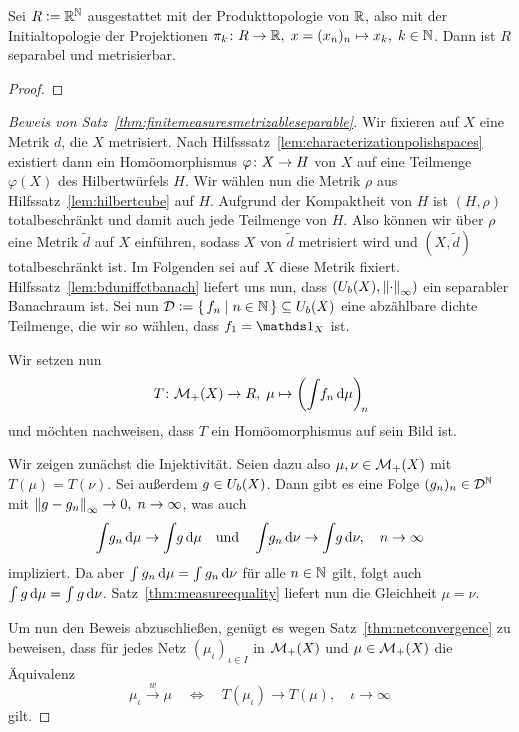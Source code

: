 \documentclass[../main/main.tex]{subfiles}
\begin{document}
	\begin{Hilfssatz}
		Sei $R \vcentcolon = \mathbb{R}^{\mathbb{N}}$ ausgestattet mit der Produkttopologie von $\mathbb{R}$, also mit der Initialtopologie der Projektionen $\pi_k \colon R \to \mathbb{R}, \; x = (x_n)_n \mapsto x_k , \; k \in \mathbb{N}$. Dann ist $R$ 
		separabel und metrisierbar.
	\end{Hilfssatz}
	
	\begin{proof}
	\end{proof}
	
	\begin{proof}[Beweis von Satz~\ref{thm:finitemeasuresmetrizableseparable}]
		Wir fixieren auf $X$ eine Metrik $d$, die $X$ metrisiert. Nach Hilfsssatz~\ref{lem:characterizationpolishspaces} existiert dann ein Homöomorphismus $\varphi \colon X \to H$ von
		$X$ auf eine Teilmenge $\varphi(X)$ des Hilbertwürfels $H$. Wir wählen nun die Metrik $\rho$ aus Hilfssatz~\ref{lem:hilbertcube} auf $H$. Aufgrund der Kompaktheit von $H$ ist
		$(H, \rho)$ totalbeschränkt und damit auch jede Teilmenge von $H$. Also können wir über $\rho$ eine Metrik $\tilde{d}$ auf $X$ einführen, sodass $X$ von $\tilde{d}$ 
		metrisiert wird und $(X, \tilde{d})$ totalbeschränkt ist. Im Folgenden sei auf $X$ diese Metrik fixiert. Hilfssatz~\ref{lem:bduniffctbanach} liefert uns nun, dass 
		$(U_b(X), \left\lVert\cdot\right\rVert_\infty)$ ein separabler Banachraum ist. Sei nun $\mathcal{D} \vcentcolon = \left\{\, f_n \; \middle| \; n \in \mathbb{N} \,\right\} \subseteq U_b(X)$ eine abzählbare dichte Teilmenge, 
		die wir so wählen, dass $f_1 = \indfct_X$ ist.
		
		Wir setzen nun
		\[ T \colon \mathcal{M}_{+}(X) \to R, \; \mu \mapsto \left( \int_{} \, f_n \, \mathrm{d}\mu \right)_{\! n}  \! \]
		und möchten nachweisen, dass $T$ ein Homöomorphismus auf sein Bild ist.
		
		Wir zeigen zunächst die Injektivität. Seien dazu also $\mu, \nu \in \mathcal{M}_{+}(X)$ mit $T(\mu) = T(\nu)$. 
		Sei außerdem $g \in U_b(X)$. Dann gibt es eine Folge $(g_n)_n \in \mathcal{D}^{\mathbb{N}}$ mit $\left\lVert g - g_n\right\rVert_\infty \to 0, \; n \to \infty$, was auch 
		\[ \int_{} \, g_n \, \mathrm{d}\mu \to \int_{} \, g \, \mathrm{d}\mu \quad \text{und} \quad \int_{} \, g_n \, \mathrm{d}\nu \to \int_{} \, g \, \mathrm{d}\nu, \quad n \to \infty \]
		impliziert. Da aber $\int_{} \, g_n \, \mathrm{d}\mu = \int_{} \, g_n \, \mathrm{d}\nu$ für alle $n \in \mathbb{N}$ gilt, folgt auch $\int_{} \, g \, \mathrm{d}\mu = \int_{} \, g \, \mathrm{d}\nu$.
		Satz~\ref{thm:measureequality} liefert nun die Gleichheit $\mu = \nu$.
		
		Um nun den Beweis abzuschließen, genügt es wegen Satz~\ref{thm:netconvergence} zu beweisen, dass für jedes Netz $(\mu_\iota)_{\iota \in I}$ in $\mathcal{M}_{+}(X)$ und $\mu \in \mathcal{M}_{+}(X)$ die
		Äquivalenz
		\[ \mu_\iota \xrightarrow{w} \mu \quad \iff \quad T(\mu_\iota) \to T(\mu), \quad \iota \to \infty  \]
		gilt.
		

\end{proof}
\end{document}
